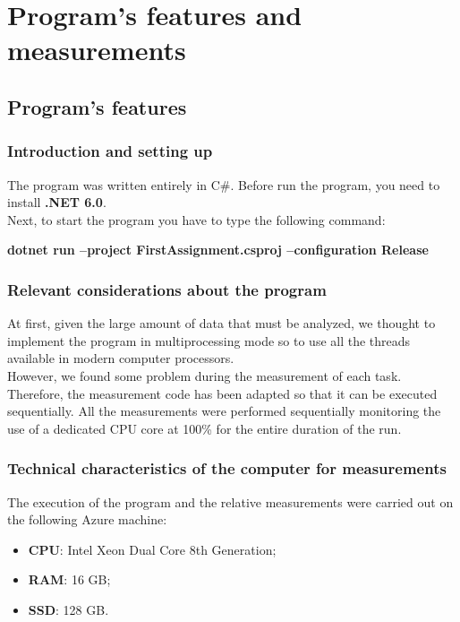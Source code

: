 \section{Program's features and measurements}

\subsection{Program's features}

\subsubsection{Introduction and setting up}
The program was written entirely in C\#.
Before run the program, you need to install \textbf{.NET 6.0}.\\
Next, to start the program you have to type the following command:\\
\centerline{\textbf{dotnet run --project FirstAssignment.csproj --configuration Release}}

\subsubsection{Relevant considerations about the program}
At first, given the large amount of data that must be analyzed, we thought to implement the program in multiprocessing
mode so to use all the threads available in modern computer processors. \\
\noindent
However, we found some problem during the measurement of each task.
Therefore, the measurement code has been adapted so that it can be executed sequentially.
All the measurements were performed sequentially monitoring the use of a dedicated CPU core at 100\% for the entire 
duration of the run.

\subsubsection{Technical characteristics of the computer for measurements}
The execution of the program and the relative measurements were carried out on the following Azure machine:
\begin{itemize}
    \item \textbf{CPU}: Intel Xeon Dual Core 8th Generation;
    \item \textbf{RAM}: 16 GB;
    \item \textbf{SSD}: 128 GB.
\end{itemize}

